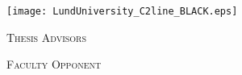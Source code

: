 
\frontmatter %

\thispagestyle{empty} %
\begin{center}
  \vspace*{5cm}
  {\Large \myMainTitle}
\end{center}



\cleardoublepage
\thispagestyle{empty} %
~
\vspace*{0.80cm}
\begin{center}
  {\Huge \myMainTitle}
  \\[2mm]
  {\Large \mySubTitle}

  \vspace*{6ex}

  {\Large\myName}

  \vspace*{6ex}
  \texttt{[image: LundUniversity\_C2line\_BLACK.eps]}

  \vspace*{6ex}

  {\large \myDegree}

  \vspace*{6ex}

  {%
    {\small\scshape Thesis Advisors}\\
    \large\myAdvisors
  }

  \bigskip

  {%
    {\small\scshape Faculty Opponent}\\
    \large \myOpponent
  }

  \vspace*{5ex}

  {\footnotesize
    \myDefenceAnnouncement
  }
  \\
\end{center}
\vfill

\newpage

